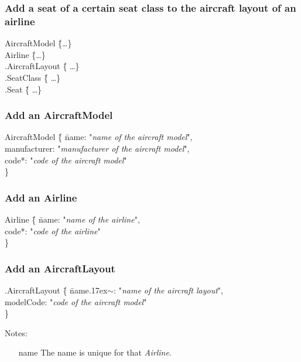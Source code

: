 \documentclass[a4paper,11pt]{article}
\newcommand{\dsltype}[1]{\textit{#1}}
\newcommand{\mytilde}{{\raise.17ex\hbox{\(\scriptstyle\sim\)}}}
\begin{document}
\subsubsection*{Add a seat of a certain seat class to the aircraft layout of an airline}
\begin{tabbing}
AircraftModel \= \{\ldots \} \\

Airline \= \{\ldots \} \\
\> .AircraftLayout \= \{ \ldots \} \\
\> \> .SeatClass \= \{ \ldots \} \\
\> \> \> .Seat \= \{ \ldots \} \\
\end{tabbing}

\subsubsection*{Add an AircraftModel}
\begin{tabbing}
AircraftModel \= \{ \= name: "\textit{name of the aircraft model}", \\
	\> \> manufacturer: "\textit{manufacturer of the aircraft model}", \\
	\> \> code*: "\textit{code of the aircraft model}" \\
\> \} \\
\end{tabbing}

\subsubsection*{Add an Airline}
\begin{tabbing}
Airline \= \{ \= name: "\textit{name of the airline}", \\
	\> \> code*: "\textit{code of the airline}" \\
\> \} \\
\end{tabbing}

\subsubsection*{Add an AircraftLayout}
\begin{tabbing}
.AircraftLayout \= \{ \= name\mytilde: "\textit{name of the aircraft layout}", \\
	\> \> modelCode: "\textit{code of the aircraft model}" \\
\> \} \\
\end{tabbing}
Notes:
\begin{enumerate}
\item[name] The name is unique for that \dsltype{Airline}.
\end{enumerate}
\end{document}
